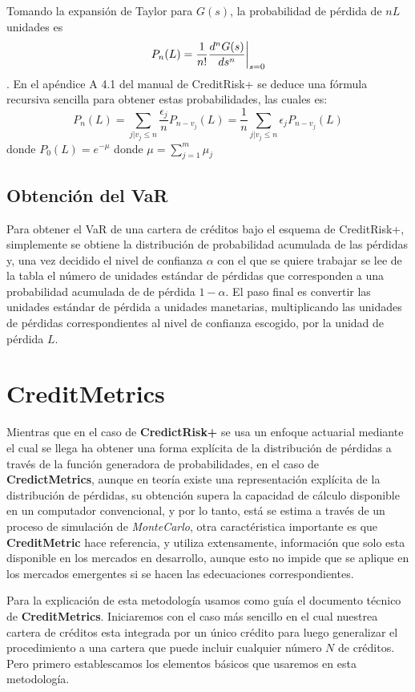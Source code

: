 \documentclass[
  12pt,
]{krantz}
\theoremstyle{definition}
\theoremstyle{definition}
\theoremstyle{definition}
\theoremstyle{remark}
\begin{document}
Tomando la expansión de Taylor para \(G(s)\), la probabilidad de pérdida de \(nL\) unidades es\[P_n(L)=\frac{1}{n!}\frac{d^nG(s)}{ds^n}\bigg{|}_{s=0}\]. En el apéndice A 4.1 del manual de CreditRisk+ se deduce una fórmula recursiva sencilla para obtener estas probabilidades, las cuales es:\[P_n(L)=\sum_{j|v_j\le n}\frac{\epsilon_j}{n}P_{n-v_j}(L)=\frac{1}{n}\sum_{j|v_j\le n}\epsilon_jP_{n-v_j}(L)\]
donde \(P_0(L)=e^{-\mu}\) donde \(\mu=\sum_{j=1}^m\mu_j\)

\hypertarget{obtencion-del-var}{%
\section{Obtención del VaR}\label{obtencion-del-var}}

Para obtener el VaR de una cartera de créditos bajo el esquema de CreditRisk+, simplemente se obtiene la distribución
de probabilidad acumulada de las pérdidas y, una vez decidido el nivel de confianza \(\alpha\) con el que se quiere trabajar se lee de la tabla el número de unidades estándar de pérdidas que corresponden a una probabilidad acumulada de de pérdida \(1-\alpha\). El paso final es convertir las unidades estándar de pérdida a unidades manetarias, multiplicando las unidades de pérdidas correspondientes al nivel de confianza escogido, por la unidad de pérdida \(L\).

\mainmatter

\hypertarget{creditmetrics}{%
\chapter{CreditMetrics}\label{creditmetrics}}

Mientras que en el caso de \textbf{CredictRisk+} se usa un enfoque actuarial mediante el cual se llega ha obtener una forma explícita de la distribución de pérdidas a través de la función generadora de probabilidades, en el caso de \textbf{CredictMetrics}, aunque en teoría existe una representación explícita de la distribución de pérdidas, su obtención supera la capacidad de cálculo disponible en un computador convencional, y por lo tanto, está se estima a través de un proceso de simulación de \emph{MonteCarlo}, otra caractéristica importante es que \textbf{CreditMetric} hace referencia, y utiliza extensamente, información que solo esta disponible en los mercados en desarrollo, aunque esto no impide que se aplique en los mercados emergentes si se hacen las edecuaciones correspondientes.

Para la explicación de esta metodología usamos como guía el documento técnico de \textbf{CreditMetrics}. Iniciaremos con el caso más sencillo en el cual nuestrea cartera de créditos esta integrada por un único crédito para luego generalizar el procedimiento a una cartera que puede incluir cualquier número \(N\) de créditos. Pero primero establescamos los elementos básicos que usaremos en esta metodología.
\end{document}
